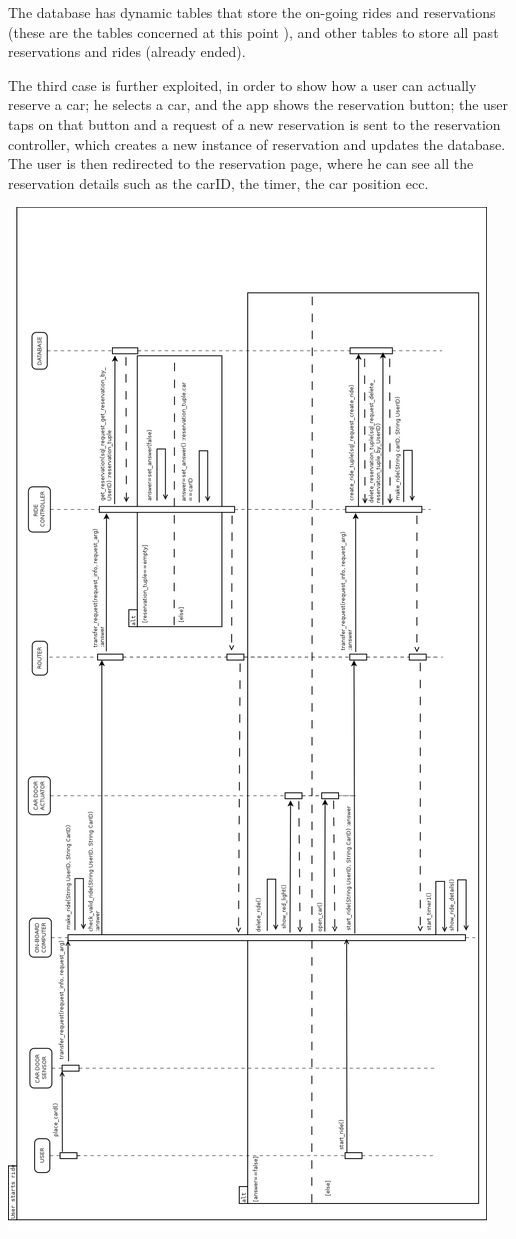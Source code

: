 \documentclass{article}
\begin{document}
\begin{flushleft}
The database has dynamic tables that store the on-going rides and reservations (these are the tables concerned at this point ), and other tables to store all past reservations and rides (already ended).

The third case is further exploited, in order to show how a user can actually reserve a car; he selects a car, and the app shows the reservation button; the user taps on that button and a request of a new reservation is sent to the reservation controller, which creates a new instance of reservation and updates the database. The user is then redirected to the reservation page, where he can see all the reservation details such as the carID, the timer, the car position ecc.


\newpage
\includegraphics[scale=0.25]{seq3_start_ride} 

\end{flushleft}
\end{document}
